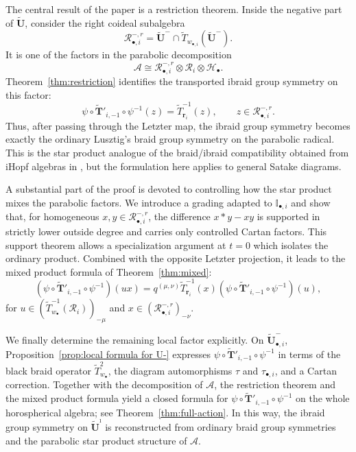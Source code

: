\documentclass[a4paper,reqno,12pt]{amsart}
\numberwithin{equation}{section}
\theoremstyle{definition}
\theoremstyle{plain}
\theoremstyle{definition}
\def\I{\mathbb I}
\def\bIi{\I_{\bullet,i}}
\def\bw{w_\bullet}
\def\br{\mathbf r}
\def\tU{\widetilde{\mathbf U}}
\def\tUi{\widetilde{\mathbf U}^{\imath}}
\def \tbiU{\tU_{\bullet,i}}
\def\tTD{\widetilde T}
\def\tTT{\widetilde{\mathbf T}}
\def\cA{\mathcal A}
\def\cR{\mathcal R}
\def\cH{\mathcal H}
\newcommand{\tTa}[1]{\tTT'_{#1,-1}}
\begin{document}
The central result of the paper is a restriction theorem.  Inside the negative part of $\tU$, consider the right coideal subalgebra
\[
   \cR_{\bullet,i}^{-,r}
   =\tU^-\cap\tTD_{w_{\bullet,i}}(\tU^-).
\]
It is one of the factors in the parabolic decomposition
\[
   \cA\cong
   \cR_{\bullet,i}^{-,r}\otimes\cR_i\otimes\cH_\bullet.
\]
Theorem~\ref{thm:restriction} identifies the transported ibraid group symmetry on this factor:
\begin{equation*}
  \psi\circ\tTa{i}\circ\psi^{-1}(z)
   =\tTD_{\br_i}^{-1}(z),
   \qquad z\in\cR_{\bullet,i}^{-,r}.
\end{equation*}
Thus, after passing through the Letzter map, the ibraid group symmetry becomes exactly the ordinary Lusztig's braid group symmetry on the parabolic radical.  This is the star product analogue of the braid/ibraid compatibility obtained from $\mathrm i$Hopf algebras in \cite{CLPRW25}, but the formulation here applies to general Satake diagrams.

A substantial part of the proof is devoted to controlling how the star product mixes the parabolic factors.  We introduce a grading adapted to $\bIi$ and show that, for homogeneous $x,y\in\cR_{\bullet,i}^{-,r}$, the difference $x\ast y-xy$ is supported in strictly lower outside degree and carries only controlled Cartan factors.  This support theorem allows a specialization argument at $t=0$ which isolates the ordinary product.  Combined with the opposite Letzter projection, it leads to the mixed product formula of Theorem~\ref{thm:mixed}:
\begin{equation*}
(\psi\circ\tTa{i}\circ\psi^{-1})(ux)
=q^{(\mu,\nu)}\tTD_{\br_i}^{-1}(x)
(\psi\circ\tTa{i}\circ\psi^{-1})(u),
\end{equation*}
for $u\in(\tTD_{\bw}^{-1}(\cR_i))_{-\mu}$ and $x\in(\cR_{\bullet,i}^{-,r})_{-\nu}$.

We finally determine the remaining local factor explicitly.  On $\tbiU^-$, Proposition~\ref{prop:local formula for U-} expresses $\psi\circ\tTa{i}\circ\psi^{-1}$ in terms of the black braid operator $\tTD_{\bw}^2$, the diagram automorphisms $\tau$ and $\tau_{\bullet,i}$, and a Cartan correction.  Together with the decomposition of $\cA$, the restriction theorem and the mixed product formula yield a closed formula for $\psi\circ\tTa{i}\circ\psi^{-1}$ on the whole horospherical algebra; see Theorem~\ref{thm:full-action}.  In this way, the ibraid group symmetry on $\tUi$ is reconstructed from ordinary braid group symmetries and the parabolic star product structure of $\cA$.
\end{document}
